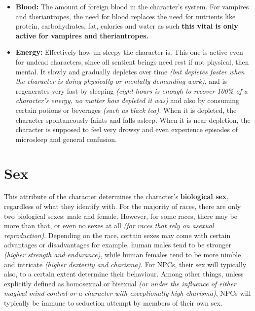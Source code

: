 \documentclass[openany,11pt,a4paper]{book}
\begin{document}
\begin{itemize}
\item \textbf{Blood:} The amount of foreign blood in the character's system. For vampires and theriantropes, the need for blood replaces the need for nutrients like protein, carbohydrates, fat, calories and water \textemdash as such \textbf{this vital is only active for vampires and theriantropes.}
\item \textbf{Energy:} Effectively how un-sleepy the character is. This one is active even for undead characters, since all sentient beings need rest \textemdash if not physical, then mental. It slowly and gradually depletes over time \textit{(but depletes faster when the character is doing physically or mentally demanding work)}, and is regenerates very fast by sleeping \textit{(eight hours is enough to recover 100\% of a character's energy, no matter how depleted it was)} and also by consuming certain potions or beverages  \textit{(such as black tea)}. When it is depleted, the character spontaneously faints and falls asleep. When it is near depletion, the character is supposed to feel very drowsy and even experience episodes of microsleep and general confusion.
\end{itemize}
\section{Sex}
This attribute of the character determines the character's \textbf{biological sex}, regardless of what they identify with. For the majority of races, there are only two biological sexes: male and female. However, for some races, there may be more than that, or even no sexes at all \textit{(for races that rely on asexual reproduction)}.\newline
Depending on the race, certain sexes may come with certain advantages or disadvantages \textemdash for example, human males tend to be stronger \textit{(higher strength and endurance)}, while human females tend to be more nimble and intricate \textit{(higher dexterity and charisma)}.
For NPCs, their sex will typically also, to a certain extent determine their behaviour. Among other things, unless explicitly defined as homosexual or bisexual \textit{(or under the influence of either magical mind-control or a character with exceptionally high charisma)}, NPCs will typically be immune to seduction attempt by members of their own sex.
\end{document}
